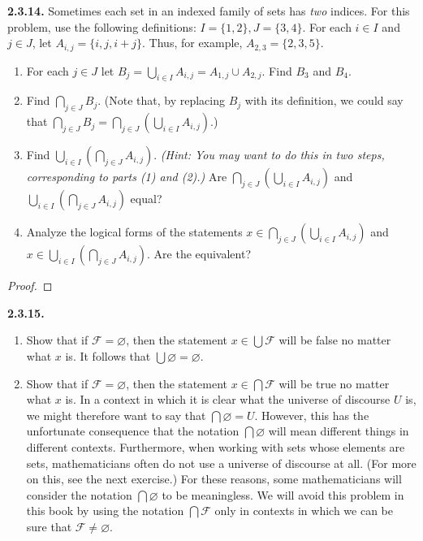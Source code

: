 \documentclass[12pt]{amsart}
\newenvironment{statement}[1]{\smallskip\noindent\color[rgb]{.6627, .3529, .6314} {\bf #1.}}{}
\theoremstyle{definition}
\theoremstyle{remark}
\begin{document}
\begin{statement}{2.3.14}
Sometimes each set in an indexed family of sets has \emph{two} indices.
For this problem, use the following definitions:
$I = \{ 1, 2 \}, J = \{ 3, 4 \}$.
For each $i \in I$ and $j \in J$, let $A_{i, j} = \{ i, j, i + j \}$.
Thus, for example, $A_{2, 3} = \{ 2, 3, 5 \}$.
\begin{enumerate}
	\item For each $j \in J$ let $B_j = \bigcup_{i \in I} A_{i, j} = A_{1, j} \cup A_{2, j}$.
	Find $B_3$ and $B_4$.
	
	\item Find $\bigcap_{j \in J} B_j$.
	(Note that, by replacing $B_j$ with its definition, we could say that
	$\bigcap_{j \in J} B_j = \bigcap_{j \in J} \left( \bigcup_{i \in I} A_{i, j} \right)$.)
	
	\item Find $\bigcup_{i \in I} \left( \bigcap_{j \in J} A_{i, j} \right)$.
	\emph{(Hint: You may want to do this in two steps, corresponding to parts (1) and (2).)}
	Are $\bigcap_{j \in J} \left( \bigcup_{i \in I} A_{i, j} \right)$
	and $\bigcup_{i \in I} \left( \bigcap_{j \in J} A_{i, j} \right)$ equal?
	
	\item Analyze the logical forms of the statements
	$x \in \bigcap_{j \in J} \left( \bigcup_{i \in I} A_{i, j} \right)$
	and $x \in \bigcup_{i \in I} \left( \bigcap_{j \in J} A_{i, j} \right)$.
	Are the equivalent?
\end{enumerate}
\end{statement}

\begin{proof}
\end{proof}


\begin{statement}{2.3.15}
\begin{enumerate}
	\item Show that if $\mathcal{F} = \varnothing$, then the statement $x \in \bigcup \mathcal{F}$
	will be false no matter what $x$ is.
	It follows that $\bigcup \varnothing = \varnothing$.
	
	\item Show that if $\mathcal{F} = \varnothing$, then the statement $x \in \bigcap \mathcal{F}$
	will be true no matter what $x$ is.
	In a context in which it is clear what the universe of discourse $U$ is,
	we might therefore want to say that $\bigcap \varnothing = U$.
	However, this has the unfortunate consequence that the notation $\bigcap \varnothing$
	will mean different things in different contexts.
	Furthermore, when working with sets whose elements are sets,
	mathematicians often do not use a universe of discourse at all.
	(For more on this, see the next exercise.)
	For these reasons, some mathematicians will consider the notation $\bigcap \varnothing$
	to be meaningless.
	We will avoid this problem in this book by using the notation $\bigcap \mathcal{F}$
	only in contexts in which we can be sure that $\mathcal{F} \neq \varnothing$.
\end{enumerate}
\end{statement}
\end{document}
